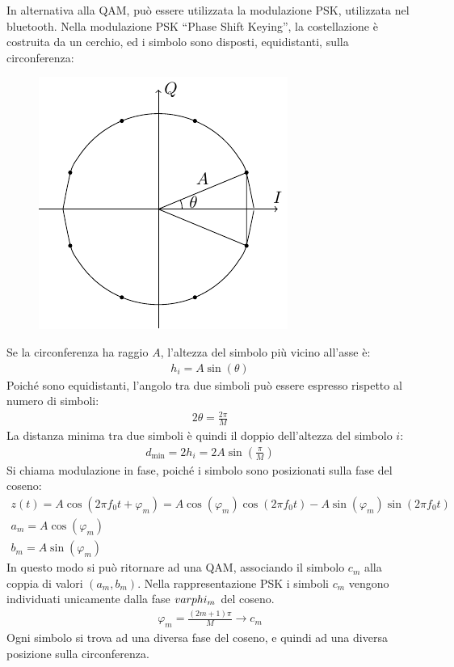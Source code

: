 \documentclass{article}
\numberwithin{equation}{subsection}
\begin{document}
In alternativa alla QAM, può essere utilizzata la modulazione PSK, utilizzata nel bluetooth. 
Nella modulazione PSK ``Phase Shift Keying'', la costellazione è costruita da un cerchio, ed i simbolo sono disposti, equidistanti, sulla circonferenza: 
\begin{figure}[H]%
    \centering
    \includegraphics{8psk.pdf}%
\end{figure}
Se la circonferenza ha raggio $A$, l'altezza del simbolo più vicino all'asse è:
\begin{gather*}
    h_i=A\sin(\theta)
\end{gather*}
Poiché sono equidistanti, l'angolo tra due simboli può essere espresso rispetto al numero di simboli:
\begin{gather*}
    2\theta=\displaystyle\frac{2\pi}{M}
\end{gather*}
La distanza minima tra due simboli è quindi il doppio dell'altezza del simbolo $i$: 
\begin{gather*}
    d_{\min}=2h_i=2A\sin\left(\displaystyle\frac{\pi}{M}\right)
\end{gather*}
Si chiama modulazione in fase, poiché i simbolo sono posizionati sulla fase del coseno:
\begin{gather*}
    z(t)=A\cos(2\pi f_0 t+\varphi_m)=A\cos(\varphi_m)\cos(2\pi f_0t)-A\sin(\varphi_m)\sin(2\pi f_0t)\\
    a_m=A\cos(\varphi_m)\\
    b_m=A\sin(\varphi_m)
\end{gather*}
In questo modo si può ritornare ad una QAM, associando il simbolo $c_m$ alla coppia di valori $(a_m,b_m)$. 
Nella rappresentazione PSK i simboli $c_m$ vengono individuati unicamente dalla fase $\\varphi_m$ del coseno. 
\begin{gather*}
    \varphi_m=\displaystyle\frac{(2m+1)\pi}{M}\to c_m
\end{gather*}
Ogni simbolo si trova ad una diversa fase del coseno, e quindi ad una diversa posizione sulla circonferenza. 
\end{document}
